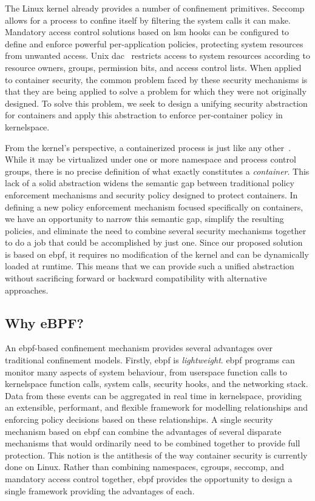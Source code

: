 \documentclass[
  fontsize=12pt,
  titlepage=firstiscover,
  paper=letter,
oneside,
  cleardoublepage=plain,
  parskip=half-,
  DIV=10,
  parindent,
  appendixprefix,
  chapterprefix,
  listof=totoc,
]{scrbook}
\begin{document}
The Linux kernel already provides a number of confinement primitives. Seccomp allows for
a process to confine itself by filtering the system calls it can make. Mandatory access
control solutions based on \gls{lsm} hooks can be configured to define and enforce
powerful per-application policies, protecting system resources from unwanted access. Unix
\gls{dac}~\cite{ritchie1974_unix, van_oorschot2020_tools_jewels, jaeger2008_os_security,
shu2016_security_isolation_study} restricts access to system resources according to
resource owners, groups, permission bits, and access control lists. When applied to
container security, the common problem faced by these security mechanisms is that they are
being applied to solve a problem for which they were not originally designed. To solve
this problem, we seek to design a unifying security abstraction for containers and apply
this abstraction to enforce per-container policy in kernelspace.

From the kernel's perspective, a containerized process is just like any
other~\cite{sultan2019_container_security}. While it may be virtualized under one or more
namespace and process control groups, there is no precise definition of what exactly
constitutes a \textit{container}. This lack of a solid abstraction widens the semantic gap
between traditional policy enforcement mechanisms and security policy designed to protect
containers. In defining a new policy enforcement mechanism focused specifically on
containers, we have an opportunity to narrow this semantic gap, simplify the resulting
policies, and eliminate the need to combine several security mechanisms together to do
a job that could be accomplished by just one. Since our proposed solution is based on
\gls{ebpf}, it requires no modification of the kernel and can be dynamically loaded at
runtime.  This means that we can provide such a unified abstraction without sacrificing
forward or backward compatibility with alternative approaches.

\subsection{Why eBPF?}\label{ss:why-ebpf}

An \gls{ebpf}-based confinement mechanism provides several advantages over traditional
confinement models.  Firstly, \gls{ebpf} is \textit{lightweight}. \gls{ebpf} programs can monitor
many aspects of system behaviour, from userspace function calls to kernelspace function
calls, system calls, security hooks, and the networking stack. Data from these events can
be aggregated in real time in kernelspace, providing an extensible, performant, and
flexible framework for modelling relationships and enforcing policy decisions based on
these relationships.  A single security mechanism based on \gls{ebpf} can combine the advantages
of several disparate mechanisms that would ordinarily need to be combined together to
provide full protection. This notion is the antithesis of the way container security is
currently done on Linux. Rather than combining namespaces, cgroups, seccomp, and mandatory
access control together, \gls{ebpf} provides the opportunity to design a single framework
providing the advantages of each.
\end{document}

